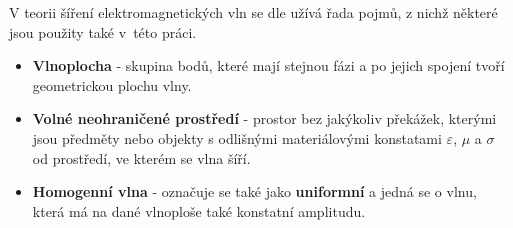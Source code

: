 V teorii šíření elektromagnetických vln se dle \cite{emp} užívá řada pojmů, z nichž některé jsou použity také v~této práci.
\begin{itemize}
\item {\bf Vlnoplocha} - skupina bodů, které mají stejnou fázi a po jejich spojení tvoří geometrickou plochu vlny.
\item {\bf Volné neohraničené prostředí} - prostor bez jakýkoliv překážek, kterými jsou předměty nebo objekty s odlišnými materiálovými konstatami  $\varepsilon$, $\mu$ a $\sigma$ od prostředí, ve kterém se vlna šíří.
\item {\bf Homogenní vlna} - označuje se také jako {\bf uniformní} a jedná se o vlnu, která má na dané vlnoploše také konstatní amplitudu.
\end{itemize}

